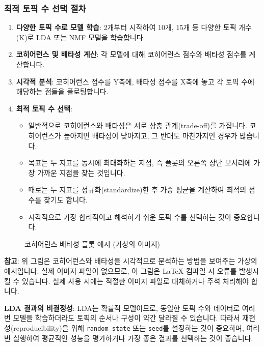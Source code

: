 \documentclass[11pt,a4paper]{article}
\theoremstyle{definition}
\begin{document}
\subsubsection*{최적 토픽 수 선택 절차}
\begin{enumerate}
    \item \textbf{다양한 토픽 수로 모델 학습}: 2개부터 시작하여 10개, 15개 등 다양한 토픽 개수(K)로 LDA 또는 NMF 모델을 학습합니다.
    \item \textbf{코히어런스 및 배타성 계산}: 각 모델에 대해 코히어런스 점수와 배타성 점수를 계산합니다.
    \item \textbf{시각적 분석}: 코히어런스 점수를 Y축에, 배타성 점수를 X축에 놓고 각 토픽 수에 해당하는 점들을 플로팅합니다.
    \item \textbf{최적 토픽 수 선택}:
    \begin{itemize}
        \item 일반적으로 코히어런스와 배타성은 서로 상충 관계(trade-off)를 가집니다. 코히어런스가 높아지면 배타성이 낮아지고, 그 반대도 마찬가지인 경우가 많습니다.
        \item 목표는 두 지표를 동시에 최대화하는 지점, 즉 플롯의 오른쪽 상단 모서리에 가장 가까운 지점을 찾는 것입니다.
        \item 때로는 두 지표를 정규화(standardize)한 후 가중 평균을 계산하여 최적의 점수를 찾기도 합니다.
        \item 시각적으로 가장 합리적이고 해석하기 쉬운 토픽 수를 선택하는 것이 중요합니다.
    \end{itemize}
\end{enumerate}

\begin{figure}[htbp]
    \centering
    \caption{코히어런스-배타성 플롯 예시 (가상의 이미지)}
    \label{fig:coherence_exclusivity}
\end{figure}
\textbf{참고}: 위 그림은 코히어런스와 배타성을 시각적으로 분석하는 방법을 보여주는 가상의 예시입니다. 실제 이미지 파일이 없으므로, 이 그림은 LaTeX 컴파일 시 오류를 발생시킬 수 있습니다. 실제 사용 시에는 적절한 이미지 파일로 대체하거나 주석 처리해야 합니다.

\begin{warningbox}
\textbf{LDA 결과의 비결정성}:
LDA는 확률적 모델이므로, 동일한 토픽 수와 데이터로 여러 번 모델을 학습하더라도 토픽의 순서나 구성이 약간 달라질 수 있습니다. 따라서 재현성(reproducibility)을 위해 \texttt{random_state} 또는 \texttt{seed}를 설정하는 것이 중요하며, 여러 번 실행하여 평균적인 성능을 평가하거나 가장 좋은 결과를 선택하는 것이 좋습니다.
\end{warningbox}
\end{document}
